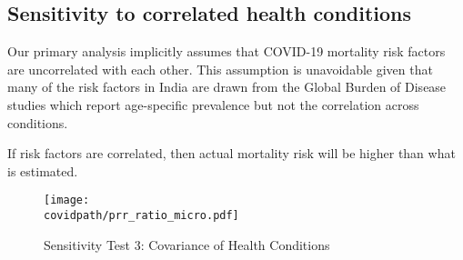 \documentclass[10pt,letterpaper]{article}
\numberwithin{equation}{section}
\begin{document}
\clearpage
\subsection{Sensitivity to correlated health conditions}

Our primary analysis implicitly assumes that COVID-19 mortality risk factors are uncorrelated with each other. This assumption is unavoidable given that many of the risk factors in India are drawn from the Global Burden of Disease studies which report age-specific prevalence but not the correlation across conditions.

If risk factors are correlated, then actual mortality risk will be higher than what is estimated.


\begin{figure}[H]
  \begin{center}
    \caption{Sensitivity Test 3: Covariance of Health Conditions}
    
    \texttt{[image: \\covidpath/prr\_ratio\_micro.pdf]}
    
    \footnotesize{}
  \end{center}
\end{figure}


\clearpage



\end{document}
